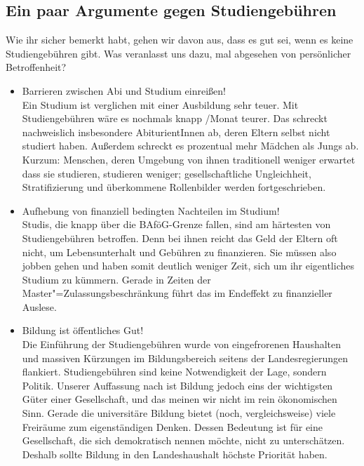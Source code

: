 \subsection*{Ein paar Argumente gegen Studiengebühren}

Wie ihr sicher bemerkt habt, gehen wir davon aus, dass es gut sei, wenn es
keine Studiengebühren gibt. Was veranlasst uns dazu, mal abgesehen von
persönlicher Betroffenheit?
\begin{itemize}
\item {Barrieren zwischen Abi und Studium einreißen!}\\Ein Studium ist
    verglichen mit einer Ausbildung sehr teuer. Mit Studiengebühren wäre es
    nochmals knapp /Monat teurer. Das schreckt nachweislich insbesondere
    AbiturientInnen ab, deren Eltern selbst nicht studiert haben. Außerdem schreckt
    es prozentual mehr Mädchen als Jungs ab. Kurzum: Menschen, deren Umgebung von
    ihnen traditionell weniger erwartet dass sie studieren, studieren weniger;
    gesellschaftliche Ungleichheit, Stratifizierung und überkommene Rollenbilder
    werden fortgeschrieben.
\item {Aufhebung von finanziell bedingten Nachteilen im Studium!}\\Studis, die
    knapp über die BAföG-Grenze fallen, sind am härtesten von Studiengebühren
    betroffen. Denn bei ihnen reicht das Geld der Eltern oft nicht, um
    Lebensunterhalt und Gebühren zu finanzieren. Sie müssen also jobben gehen und
    haben somit deutlich weniger Zeit, sich um ihr eigentliches Studium zu kümmern.
    Gerade in Zeiten der Master"=Zulassungsbeschränkung führt das im Endeffekt zu
    finanzieller Auslese.
\item {Bildung ist öffentliches Gut!}\\Die Einführung der Studiengebühren wurde
    von eingefrorenen Haushalten und massiven Kürzungen im Bildungsbereich seitens
    der Landesregierungen flankiert. Studiengebühren sind keine Notwendigkeit der
    Lage, sondern Politik. Unserer Auffassung nach ist Bildung jedoch eins der
    wichtigsten Güter einer Gesellschaft, und das meinen wir nicht im rein
    ökonomischen Sinn. Gerade die universitäre Bildung bietet (noch,
    vergleichsweise) viele Freiräume zum eigenständigen Denken. Dessen Bedeutung
    ist für eine Gesellschaft, die sich demokratisch nennen möchte, nicht zu
    unterschätzen. Deshalb sollte Bildung in den Landeshaushalt höchste Priorität
    haben.
\end{itemize}


